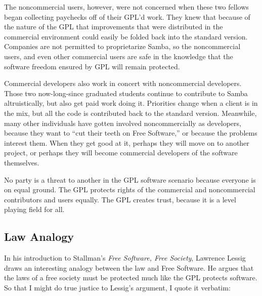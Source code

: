 The noncommercial users, however, were not concerned when these two
fellows began collecting paychecks off of their GPL'd work.  They knew
that because of the nature of the GPL that improvements that were
distributed in the commercial environment could easily be folded back into
the standard version.  Companies are not permitted to proprietarize
Samba, so the noncommercial users, and even other commercial users are
safe in the knowledge that the software freedom ensured by GPL will remain
protected.

Commercial developers also work in concert with noncommercial
developers.  Those two now-long-since graduated students continue to
contribute to Samba altruistically, but also get paid work doing it.
Priorities change when a client is in the mix, but all the code is
contributed back to the standard version.  Meanwhile, many other
individuals have gotten involved noncommercially as developers,
because they want to ``cut their teeth on Free Software,'' or because
the problems interest them.  When they get good at it, perhaps they
will move on to another project, or perhaps they will become
commercial developers of the software themselves.

No party is a threat to another in the GPL software scenario because
everyone is on equal ground.  The GPL protects rights of the commercial
and noncommercial contributors and users equally. The GPL creates trust,
because it is a level playing field for all.

\subsection{Law Analogy}

In his introduction to Stallman's \emph{Free Software, Free Society},
Lawrence Lessig draws an interesting analogy between the law and Free
Software. He argues that the laws of a free society must be protected
much like the GPL protects software.  So that I might do true justice to
Lessig's argument, I quote it verbatim:

